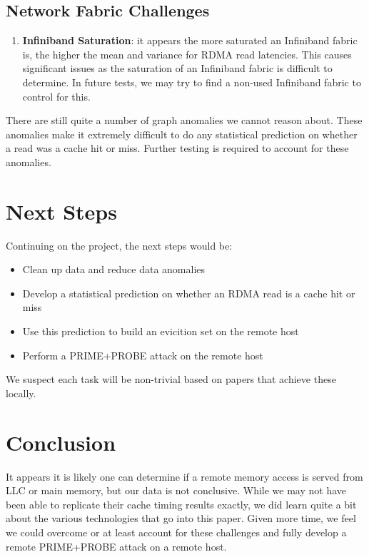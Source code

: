 \documentclass[twocolumn]{article}
\begin{document}
\subsection{Network Fabric Challenges}
\begin{enumerate}
 \item \textbf{Infiniband Saturation}: it appears the more saturated an Infiniband fabric is, the higher the mean and variance for RDMA read latencies.
       This causes significant issues as the saturation of an Infiniband fabric is difficult to determine. In future tests, we may try to find a non-used Infiniband fabric to control for this.
\end{enumerate}

There are still quite a number of graph anomalies we cannot reason about.
These anomalies make it extremely difficult to do any statistical prediction on whether a read was a cache hit or miss.
Further testing is required to account for these anomalies.

\section{Next Steps}
Continuing on the project, the next steps would be:
\begin{itemize}
 \item Clean up data and reduce data anomalies
 \item Develop a statistical prediction on whether an RDMA read is a cache hit or miss
 \item Use this prediction to build an evicition set on the remote host
 \item Perform a PRIME+PROBE attack on the remote host
\end{itemize}
We suspect each task will be non-trivial based on papers that achieve these locally.

\section{Conclusion}
It appears it is likely one can determine if a remote memory access is served from LLC or main memory, but our data is not conclusive. While we may not have been able to replicate their cache timing results exactly, we did learn quite a bit about the various technologies that go into this paper. Given more time, we feel we could overcome or at least account for these challenges and fully develop a remote PRIME+PROBE attack on a remote host.

\printbibliography
\end{document}
